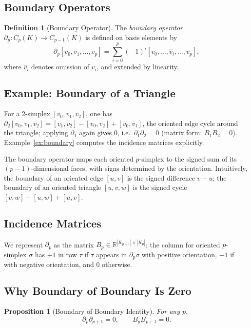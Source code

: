 \documentclass[11pt]{article}
\newtheorem{proposition}[theorem]{Proposition}
\theoremstyle{definition}
\newtheorem{definition}[theorem]{Definition}
\theoremstyle{remark}
\newcommand{\R}{\mathbb{R}}
\begin{document}
\subsection{Boundary Operators}

\begin{definition}[Boundary Operator]
The \emph{boundary operator} $\partial_p\colon C_p(K)\to C_{p-1}(K)$ is
defined on basis elements by
\[
  \partial_p[v_0,v_1,\dots,v_p]
  = \sum_{i=0}^{p}(-1)^i[v_0,\dots,\hat{v}_i,\dots,v_p],
\]
where $\hat{v}_i$ denotes omission of $v_i$, and extended by linearity.
\end{definition}

\subsection{Example: Boundary of a Triangle}

For a 2-simplex $[v_0,v_1,v_2]$, one has
$\partial_2[v_0,v_1,v_2]=[v_1,v_2]-[v_0,v_2]+[v_0,v_1]$, the oriented edge cycle
around the triangle; applying $\partial_1$ again gives $0$, i.e.\ $\partial_1\partial_2=0$
(matrix form: $B_1B_2=0$). Example~\ref{ex:boundary} computes the incidence matrices
explicitly.

The boundary operator maps each oriented $p$-simplex to the signed sum of its
$(p-1)$-dimensional faces, with signs determined by the orientation. Intuitively,
the boundary of an oriented edge $[u,v]$ is the signed difference $v-u$; the
boundary of an oriented triangle $[u,v,w]$ is the signed cycle
$[v,w]-[u,w]+[u,v]$.

\subsection{Incidence Matrices}

We represent $\partial_p$ as the matrix $B_p \in \R^{|K_{p-1}|\times|K_p|}$:
the column for oriented $p$-simplex $\sigma$ has $+1$ in row $\tau$ if $\tau$
appears in $\partial_p\sigma$ with positive orientation, $-1$ if with negative
orientation, and $0$ otherwise.

\subsection{Why Boundary of Boundary Is Zero}

\begin{proposition}[Boundary of Boundary Identity]
\label{prop:b2}
For any $p$,
\[
  \partial_p\partial_{p+1} = 0, \qquad B_pB_{p+1} = 0.
\]
\end{proposition}
\end{document}
